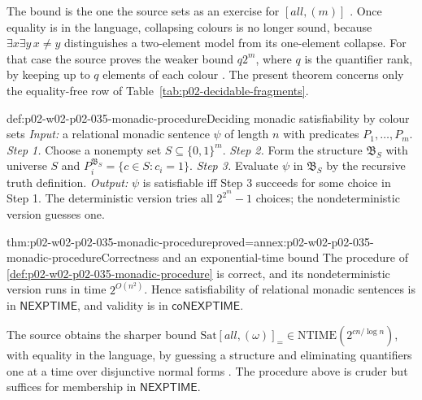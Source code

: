 The bound is the one the source sets as an exercise for
\([\mathit{all},(m)]\) \cite[ex.~6.2.3]{BorgerGradelGurevich1997}.  Once
equality is in the language, collapsing colours is no longer sound, because
\(\exists x\exists y\,x\neq y\) distinguishes a two-element model from its
one-element collapse.  For that case the source proves the weaker bound
\(q2^m\), where \(q\) is the quantifier rank, by keeping up to \(q\) elements
of each colour \cite[prop.~6.2.1]{BorgerGradelGurevich1997}.  The present
theorem concerns only the equality-free row of
Table~\ref{tab:p02-decidable-fragments}.

\begin{hbmethod}{def:p02-w02-p02-035-monadic-procedure}{Deciding monadic satisfiability by colour sets}
\emph{Input:} a relational monadic sentence \(\psi\) of length \(n\) with
predicates \(P_1,\ldots,P_m\).
\emph{Step 1.} Choose a nonempty set \(S\subseteq\{0,1\}^m\).
\emph{Step 2.} Form the structure \(\mathfrak B_S\) with universe \(S\) and
\(P_i^{\mathfrak B_S}=\{c\in S:c_i=1\}\).
\emph{Step 3.} Evaluate \(\psi\) in \(\mathfrak B_S\) by the recursive truth
definition.
\emph{Output:} \(\psi\) is satisfiable iff Step 3 succeeds for some choice in
Step 1.  The deterministic version tries all \(2^{2^m}-1\) choices; the
nondeterministic version guesses one.
\end{hbmethod}

\begin{hbtheorem}{thm:p02-w02-p02-035-monadic-procedure}{proved=annex:p02-w02-p02-035-monadic-procedure}{Correctness and an exponential-time bound}
The procedure of \cref{def:p02-w02-p02-035-monadic-procedure} is correct, and
its nondeterministic version runs in time \(2^{O(n^2)}\).  Hence
satisfiability of relational monadic sentences is in \(\mathsf{NEXPTIME}\),
and validity is in \(\mathsf{coNEXPTIME}\).
\end{hbtheorem}

The source obtains the sharper bound
\(\mathrm{Sat}[\mathit{all},(\omega)]_{=}\in\mathrm{NTIME}(2^{cn/\log n})\),
with equality in the language, by guessing a structure and eliminating quantifiers
one at a time over disjunctive normal forms
\cite[prop.~6.2.9 and cor.~6.2.10]{BorgerGradelGurevich1997}.  The procedure
above is cruder but suffices for membership in \(\mathsf{NEXPTIME}\).

